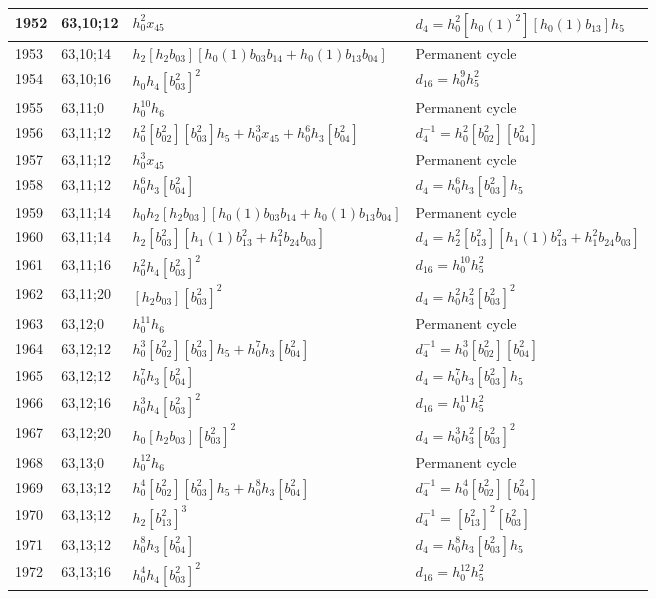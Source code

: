 \documentclass{article}
\begin{document}
\begin{longtable}{|l|l|>{\raggedright\arraybackslash}p{6cm}|>{\raggedright\arraybackslash}p{6cm}|}
1952 & 63,10;12 & $h_0^2x_{45}$ &$d_{4}=h_0^2[h_0(1)^2][h_0(1)b_{13}]h_5$\\
\hline
1953 & 63,10;14 & $h_2[h_2b_{03}][h_0(1)b_{03}b_{14} + h_0(1)b_{13}b_{04}]$ & Permanent cycle\\
\hline
1954 & 63,10;16 & $h_0h_4[b_{03}^2]^2$ &$d_{16}=h_0^9h_5^2$\\
\hline
1955 & 63,11;0 & $h_0^{10}h_6$ & Permanent cycle\\
\hline
1956 & 63,11;12 & $h_0^2[b_{02}^2][b_{03}^2]h_5 + h_0^3x_{45} + h_0^6h_3[b_{04}^2]$ & $d_{4}^{-1}=h_0^2[b_{02}^2][b_{04}^2]$\\
1957 & 63,11;12 & $h_0^3x_{45}$ & Permanent cycle\\
1958 & 63,11;12 & $h_0^6h_3[b_{04}^2]$ &$d_{4}=h_0^6h_3[b_{03}^2]h_5$\\
\hline
1959 & 63,11;14 & $h_0h_2[h_2b_{03}][h_0(1)b_{03}b_{14} + h_0(1)b_{13}b_{04}]$ & Permanent cycle\\
1960 & 63,11;14 & $h_2[b_{03}^2][h_1(1)b_{13}^2 + h_1^2b_{24}b_{03}]$ &$d_{4}=h_2^2[b_{13}^2][h_1(1)b_{13}^2 + h_1^2b_{24}b_{03}]$\\
\hline
1961 & 63,11;16 & $h_0^2h_4[b_{03}^2]^2$ &$d_{16}=h_0^{10}h_5^2$\\
\hline
1962 & 63,11;20 & $[h_2b_{03}][b_{03}^2]^2$ &$d_{4}=h_0^2h_3^2[b_{03}^2]^2$\\
\hline
1963 & 63,12;0 & $h_0^{11}h_6$ & Permanent cycle\\
\hline
1964 & 63,12;12 & $h_0^3[b_{02}^2][b_{03}^2]h_5 + h_0^7h_3[b_{04}^2]$ & $d_{4}^{-1}=h_0^3[b_{02}^2][b_{04}^2]$\\
1965 & 63,12;12 & $h_0^7h_3[b_{04}^2]$ &$d_{4}=h_0^7h_3[b_{03}^2]h_5$\\
\hline
1966 & 63,12;16 & $h_0^3h_4[b_{03}^2]^2$ &$d_{16}=h_0^{11}h_5^2$\\
\hline
1967 & 63,12;20 & $h_0[h_2b_{03}][b_{03}^2]^2$ &$d_{4}=h_0^3h_3^2[b_{03}^2]^2$\\
\hline
1968 & 63,13;0 & $h_0^{12}h_6$ & Permanent cycle\\
\hline
1969 & 63,13;12 & $h_0^4[b_{02}^2][b_{03}^2]h_5 + h_0^8h_3[b_{04}^2]$ & $d_{4}^{-1}=h_0^4[b_{02}^2][b_{04}^2]$\\
1970 & 63,13;12 & $h_2[b_{13}^2]^3$ & $d_{4}^{-1}=[b_{13}^2]^2[b_{03}^2]$\\
1971 & 63,13;12 & $h_0^8h_3[b_{04}^2]$ &$d_{4}=h_0^8h_3[b_{03}^2]h_5$\\
\hline
1972 & 63,13;16 & $h_0^4h_4[b_{03}^2]^2$ &$d_{16}=h_0^{12}h_5^2$\\

\end{longtable}
\end{document}
